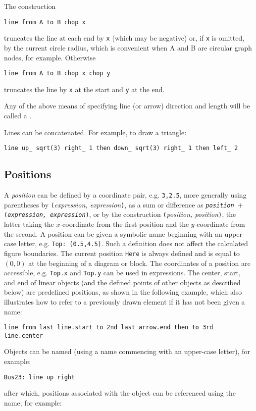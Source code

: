 The construction

{\tt line from A to B chop x}

\noindent
truncates the line at each end by {\tt x} (which may be negative)
or, if {\tt x} is omitted, by
the current circle radius, which is convenient when A and B are
circular graph nodes, for example.  Otherwise

{\tt line from A to B chop x chop y}

\noindent
truncates the line by {\tt x} at the start and {\tt y} at the end.

Any of the above means of specifying line (or arrow) direction and length
will be called a \linespec.

Lines can be concatenated.  For example, to draw a triangle:

{\tt line up\_ sqrt(3) right\_ 1 then down\_ sqrt(3) right\_ 1 then left\_ 2}

\subsection{Positions\label{Positions:}}
A {\sl position} can be defined by a coordinate pair, e.g. {\tt 3,2.5},
more generally using parentheses by {\tt (}{\sl expression, expression}{\tt )},
as a sum or difference as
{\tt{\sl position} $+$ ({\sl expression, expression})},
or by the construction {\tt (}{\sl position, position}{\tt )},
the latter taking the $x$-coordinate from the first
position and the $y$-coordinate from the second.  A position can be
given a symbolic name beginning with an upper-case letter,
e.g. {\tt Top:~(0.5,4.5)}.  Such a definition does not affect the calculated
figure boundaries.  The current position {\tt Here} is always defined and
is equal to $(0,0)$ at the beginning of a diagram or block.
The coordinates of a position are accessible, e.g. {\tt Top.x} and
{\tt Top.y} can be used in expressions.  The center, start, and end of
linear objects (and the defined points of other objects as described below)
are predefined positions, as shown in the following example,
which also illustrates how to refer to a previously drawn element if it has
not been given a name:

{\tt line from last line.start to 2nd last arrow.end then to 3rd line.center}

Objects can be named (using a name commencing with an upper-case letter),
for example:

{\tt Bus23: line up right}

\noindent
after which, positions associated with the object can be referenced using the
name; for example:

